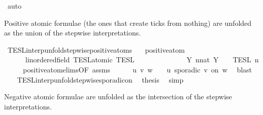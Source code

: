 \begin{isabellebody}
%
\isadelimproof
%
\endisadelimproof
%
\isatagproof
{}\isamarkupfalse%
\ auto%
\endisatagproof
{\isafoldproof}%
%
\isadelimproof
%
\endisadelimproof
%
\begin{isamarkuptext}%
Positive atomic formulae (the ones that create ticks from nothing) are unfolded
  as the union of the stepwise interpretations.%
\end{isamarkuptext}\isamarkuptrue%
\isamarkupfalse%
\ TESL{\isacharunderscore}interp{\isacharunderscore}unfold{\isacharunderscore}stepwise{\isacharunderscore}positive{\isacharunderscore}atoms{\isacharcolon}\isanewline
\ \ \ {\isacartoucheopen}positive{\isacharunderscore}atom\ {\isasymphi}{\isacartoucheclose}\isanewline
\ \ \ \ \ {\isacartoucheopen}{\isasymlbrakk}\ {\isasymphi}{\isacharcolon}{\isacharcolon}{\isacharprime}{\isasymtau}{\isacharcolon}{\isacharcolon}linordered{\isacharunderscore}field\ TESL{\isacharunderscore}atomic\ {\isasymrbrakk}\isactrlsub T\isactrlsub E\isactrlsub S\isactrlsub L\isanewline
\ \ \ \ \ \ \ \ \ \ \ \ {\isacharequal}\ {\isasymUnion}\ {\isacharbraceleft}Y{\isachardot}\ {\isasymexists}n{\isacharcolon}{\isacharcolon}nat{\isachardot}\ Y\ {\isacharequal}\ {\isasymlbrakk}\ {\isasymphi}\ {\isasymrbrakk}\isactrlsub T\isactrlsub E\isactrlsub S\isactrlsub L\isactrlbsup {\isasymge}\ n\isactrlesup {\isacharbraceright}{\isacartoucheclose}\isanewline
%
\isadelimproof
%
\endisadelimproof
%
\isatagproof
{}\isamarkupfalse%
\ {\isacharminus}\isanewline
\ \ \isamarkupfalse%
\ positive{\isacharunderscore}atom{\isachardot}elims{\isacharparenleft}{}{\isacharparenright}{\isacharbrackleft}OF\ assms{\isacharbrackright}\isanewline
\ \ \ \ \isamarkupfalse%
\ u\ v\ w\ \ {\isacartoucheopen}{\isasymphi}\ {\isacharequal}\ {\isacharparenleft}u\ sporadic\ v\ on\ w{\isacharparenright}{\isacartoucheclose}\ \isamarkupfalse%
\ blast\isanewline
\ \ \isamarkupfalse%
\ TESL{\isacharunderscore}interp{\isacharunderscore}unfold{\isacharunderscore}stepwise{\isacharunderscore}sporadicon\ \isamarkupfalse%
\ {\isacharquery}thesis\ \isamarkupfalse%
\ simp\isanewline
{}\isamarkupfalse%
%
\endisatagproof
{\isafoldproof}%
%
\isadelimproof
%
\endisadelimproof
%
\begin{isamarkuptext}%
Negative atomic formulae are unfolded
  as the intersection of the stepwise interpretations.%
\end{isamarkuptext}\isamarkuptrue%

\end{isabellebody}
